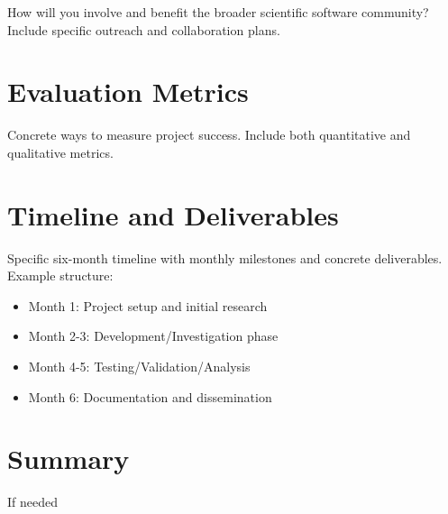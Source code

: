 \documentclass[letterpaper, 11pt]{article}
\begin{document}
How will you involve and benefit the broader scientific software community?
Include specific outreach and collaboration plans.

\section{Evaluation Metrics}

Concrete ways to measure project success.
Include both quantitative and qualitative metrics.

\section{Timeline and Deliverables}

Specific six-month timeline with monthly milestones and concrete deliverables.
Example structure:

\begin{itemize}
  \item Month 1: Project setup and initial research
  \item Month 2-3: Development/Investigation phase
  \item Month 4-5: Testing/Validation/Analysis
  \item Month 6: Documentation and dissemination
\end{itemize}

\section{Summary}

If needed

%
\vspace*{-0.25cm}
\begin{footnotesize}
%
 
 
%
\end{footnotesize}
\end{document}
